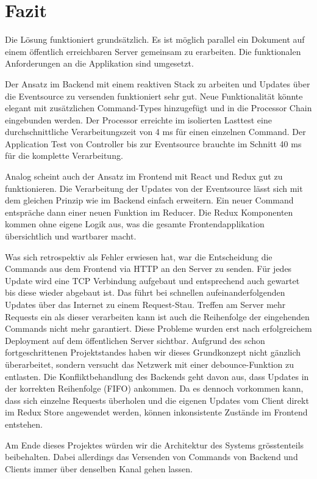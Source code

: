 \section{Fazit}

Die Lösung funktioniert grundsätzlich.
Es ist möglich parallel ein Dokument auf einem öffentlich erreichbaren Server gemeinsam zu erarbeiten.
Die funktionalen Anforderungen an die Applikation sind umgesetzt.

Der Ansatz im Backend mit einem reaktiven Stack zu arbeiten und Updates über die Eventsource zu versenden funktioniert sehr gut.
Neue Funktionalität könnte elegant mit zusätzlichen Command-Types hinzugefügt und in die Processor Chain eingebunden werden.
Der Processor erreichte im isolierten Lasttest eine durchschnittliche Verarbeitungszeit von 4 ms für einen einzelnen Command.
Der Application Test von Controller bis zur Eventsource brauchte im Schnitt 40 ms für die komplette Verarbeitung.

Analog scheint auch der Ansatz im Frontend mit React und Redux gut zu funktionieren.
Die Verarbeitung der Updates von der Eventsource lässt sich mit dem gleichen Prinzip wie im Backend einfach erweitern.
Ein neuer Command entspräche dann einer neuen Funktion im Reducer.
Die Redux Komponenten kommen ohne eigene Logik aus, was die gesamte Frontendapplikation übersichtlich und wartbarer macht.

Was sich retrospektiv als Fehler erwiesen hat, war die Entscheidung die Commands aus dem Frontend via HTTP an den Server zu senden.
Für jedes Update wird eine TCP Verbindung aufgebaut und entsprechend auch gewartet bis diese wieder abgebaut ist.
Das führt bei schnellen aufeinanderfolgenden Updates über das Internet zu einem Request-Stau.
Treffen am Server mehr Requests ein als dieser verarbeiten kann ist auch die Reihenfolge der eingehenden Commands nicht mehr garantiert.
Diese Probleme wurden erst nach erfolgreichem Deployment auf dem öffentlichen Server sichtbar.
Aufgrund des schon fortgeschrittenen Projektstandes haben wir dieses Grundkonzept nicht gänzlich überarbeitet, sondern versucht das Netzwerk mit einer debounce-Funktion zu entlasten.
Die Konfliktbehandlung des Backends geht davon aus, dass Updates in der korrekten Reihenfolge (FIFO) ankommen.
Da es dennoch vorkommen kann, dass sich einzelne Requests überholen und die eigenen Updates vom Client direkt im Redux Store angewendet werden, können inkonsistente Zustände im Frontend entstehen.

Am Ende dieses Projektes würden wir die Architektur des Systems grösstenteils beibehalten.
Dabei allerdings das Versenden von Commands von Backend und Clients immer über denselben Kanal gehen lassen.
